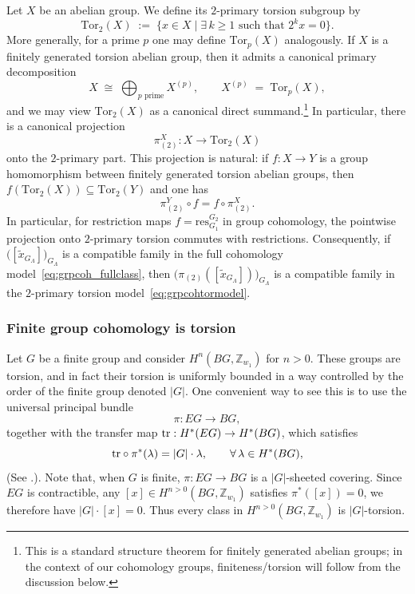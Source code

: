 \documentclass[aps,prx,reprint,superscriptaddress,twocolumn,amsmath,amssymb,amsfonts, nofootinbib]{revtex4-2}
\newcommand{\tr}{{\rm tr}}
\newcommand{\res}{\text{res}}
\newcommand{\tor}{\text{Tor}}
\theoremstyle{apsstyle}
\begin{document}
Let $X$ be an abelian group. We define its $2$-primary torsion subgroup by
\begin{equation}
    \tor_{2}(X)\;:=\;\{x\in X \mid \exists\,k\ge 1\text{ such that }2^k x=0\}.
\end{equation}
More generally, for a prime $p$ one may define $\tor_p(X)$ analogously. If $X$ is a finitely generated torsion abelian group, then it admits a canonical primary decomposition
\begin{equation}
    X \;\cong\; \bigoplus_{p\text{ prime}} X^{(p)}, \qquad X^{(p)} \;=\; \tor_p(X),
\end{equation}
and we may view $\tor_2(X)$ as a canonical direct summand.\footnote{This is a standard structure theorem for finitely generated abelian groups; in the context of our cohomology groups, finiteness/torsion will follow from the discussion below.} In particular, there is a canonical projection 
\begin{equation*}
\pi^{X}_{(2)}:X\to \tor_2(X)
\end{equation*}
onto the $2$-primary part. This projection is natural: if $f:X\to Y$ is a group homomorphism between finitely generated torsion abelian groups, then $f(\tor_2(X))\subseteq \tor_2(Y)$ and one has
\begin{equation}
\label{eq:pi2_natural}
    \pi_{(2)}^{Y}\circ f = f\circ \pi_{(2)}^{X}.
\end{equation}
In particular, for restriction maps $f=\res^{G_2}_{G_1}$ in group cohomology, the pointwise projection onto $2$-primary torsion commutes with restrictions. Consequently, if $\big([\tilde{x}_{G_{\Lambda}}]\big)_{G_{\Lambda}}$ is a compatible family in the full cohomology model~\eqref{eq:grpcoh_fullclass}, then $\big(\pi_{(2)}([\tilde{x}_{G_{\Lambda}}])\big)_{G_{\Lambda}}$ is a compatible family in the $2$-primary torsion model~\eqref{eq:grpcohtormodel}.

\subsubsection{Finite group cohomology is torsion}
\label{app:res_cores}

Let $G$ be a finite group and consider $H^n(BG,\mathbb{Z}_{w_1})$ for $n>0$. These groups are torsion, and in fact their torsion is uniformly bounded in a way controlled by the order of the finite group denoted $|G|$. One convenient way to see this is to use the universal principal bundle
\begin{equation}
    \pi: EG \longrightarrow BG,
\end{equation}
together with the transfer map $\tr:H^\ast(EG)\to H^\ast(BG)$, which satisfies
\begin{equation}
    \tr\circ \pi^\ast(\lambda)=|G|\cdot \lambda,\qquad \forall\,\lambda\in H^\ast(BG),
\end{equation}
(See \cite[\S3.G]{Hatcher_AT}.). Note that, when $G$ is finite, $\pi:EG\to BG$ is a $|G|$-sheeted covering. Since $EG$ is contractible, any $[x]\in H^{n>0}(BG,\mathbb{Z}_{w_1})$ satisfies $\pi^\ast([x])=0$, we therefore have $|G|\cdot [x]=0$. Thus every class in $H^{n>0}(BG,\mathbb{Z}_{w_1})$ is $|G|$-torsion.
\end{document}

